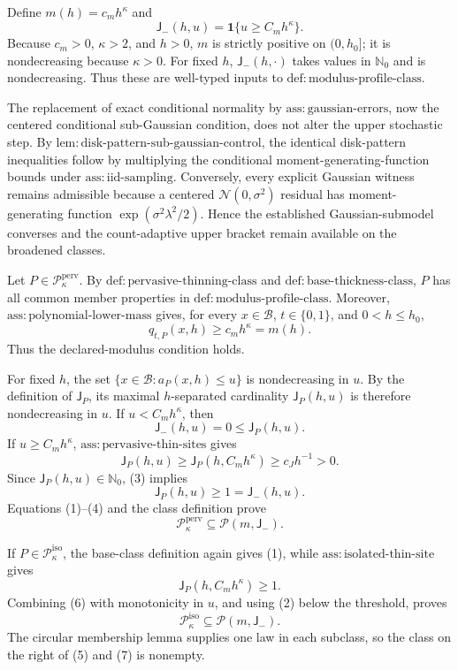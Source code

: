 Define \(m(h)=c_mh^\kappa\) and
\[
 \mathsf J_{-}(h,u)=\mathbf 1\{u\ge C_mh^\kappa\}.
\]
Because \(c_m>0\), \(\kappa>2\), and \(h>0\), \(m\) is strictly positive on \((0,h_0]\); it is nondecreasing because \(\kappa>0\). For fixed \(h\), \(\mathsf J_{-}(h,\cdot)\) takes values in \(\mathbb N_0\) and is nondecreasing. Thus these are well-typed inputs to \(\mathrm{def:modulus\text{-}profile\text{-}class}\).

The replacement of exact conditional normality by \(\mathrm{ass:gaussian\text{-}errors}\), now the centered conditional sub-Gaussian condition, does not alter the upper stochastic step. By \(\mathrm{lem:disk\text{-}pattern\text{-}sub\text{-}gaussian\text{-}control}\), the identical disk-pattern inequalities follow by multiplying the conditional moment-generating-function bounds under \(\mathrm{ass:iid\text{-}sampling}\). Conversely, every explicit Gaussian witness remains admissible because a centered \(\mathcal N(0,\sigma^2)\) residual has moment-generating function \(\exp(\sigma^2\lambda^2/2)\). Hence the established Gaussian-submodel converses and the count-adaptive upper bracket remain available on the broadened classes.

Let \(P\in\mathcal P_{\kappa}^{\mathrm{perv}}\). By \(\mathrm{def:pervasive\text{-}thinning\text{-}class}\) and \(\mathrm{def:base\text{-}thickness\text{-}class}\), \(P\) has all common member properties in \(\mathrm{def:modulus\text{-}profile\text{-}class}\). Moreover, \(\mathrm{ass:polynomial\text{-}lower\text{-}mass}\) gives, for every \(x\in\mathcal B\), \(t\in\{0,1\}\), and \(0<h\le h_0\),
\[
 q_{t,P}(x,h)\ge c_mh^\kappa=m(h). \tag{1}
\]
Thus the declared-modulus condition holds.

For fixed \(h\), the set \(\{x\in\mathcal B:a_P(x,h)\le u\}\) is nondecreasing in \(u\). By the definition of \(\mathsf J_P\), its maximal \(h\)-separated cardinality \(\mathsf J_P(h,u)\) is therefore nondecreasing in \(u\). If \(u<C_mh^\kappa\), then
\[
 \mathsf J_{-}(h,u)=0\le\mathsf J_P(h,u). \tag{2}
\]
If \(u\ge C_mh^\kappa\), \(\mathrm{ass:pervasive\text{-}thin\text{-}sites}\) gives
\[
 \mathsf J_P(h,u)\ge\mathsf J_P(h,C_mh^\kappa)\ge c_Jh^{-1}>0. \tag{3}
\]
Since \(\mathsf J_P(h,u)\in\mathbb N_0\), (3) implies
\[
 \mathsf J_P(h,u)\ge1=\mathsf J_{-}(h,u). \tag{4}
\]
Equations (1)--(4) and the class definition prove
\[
 \mathcal P_{\kappa}^{\mathrm{perv}}\subseteq\mathcal P(m,\mathsf J_{-}). \tag{5}
\]

If \(P\in\mathcal P_{\kappa}^{\mathrm{iso}}\), the base-class definition again gives (1), while \(\mathrm{ass:isolated\text{-}thin\text{-}site}\) gives
\[
 \mathsf J_P(h,C_mh^\kappa)\ge1. \tag{6}
\]
Combining (6) with monotonicity in \(u\), and using (2) below the threshold, proves
\[
 \mathcal P_{\kappa}^{\mathrm{iso}}\subseteq\mathcal P(m,\mathsf J_{-}). \tag{7}
\]
The circular membership lemma supplies one law in each subclass, so the class on the right of (5) and (7) is nonempty.

